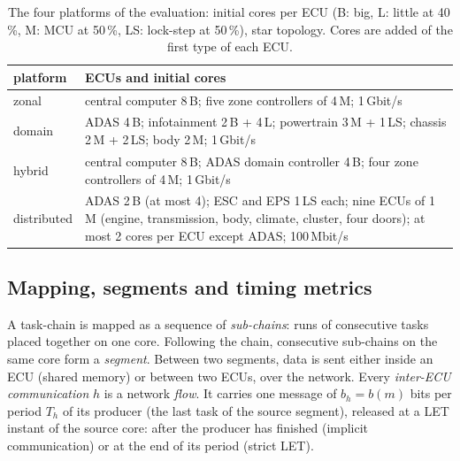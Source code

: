 \begin{table}[t]
\centering\footnotesize
\caption{The four platforms of the evaluation: initial cores per ECU
(B: big, L: little at 40\,\%, M: MCU at 50\,\%, LS: lock-step at
50\,\%), star topology. Cores are added of the first type of each ECU.}
\label{tab:templates}
\setlength{\tabcolsep}{3pt}
\begin{tabularx}{\columnwidth}{@{}lX@{}}
\toprule
\rowcolor{white}
platform & ECUs and initial cores \\
\midrule
zonal & central computer 8\,B; five zone controllers of 4\,M; 1\,Gbit/s \\
domain & ADAS 4\,B; infotainment 2\,B + 4\,L; powertrain 3\,M + 1\,LS;
chassis 2\,M + 2\,LS; body 2\,M; 1\,Gbit/s \\
hybrid & central computer 8\,B; ADAS domain controller 4\,B; four zone
controllers of 4\,M; 1\,Gbit/s \\
distributed & ADAS 2\,B (at most 4); ESC and EPS 1\,LS each; nine ECUs
of 1\,M (engine, transmission, body, climate, cluster, four doors); at
most 2 cores per ECU except ADAS; 100\,Mbit/s \\
\bottomrule
\end{tabularx}
\end{table}

\subsection{Mapping, segments and timing metrics}
\label{sec:metrics}

A task-chain is mapped as a sequence of \emph{sub-chains}: runs of
consecutive tasks placed together on one core. Following the chain,
consecutive sub-chains on the same core form a \emph{segment}. Between two
segments, data is sent either inside an ECU (shared memory) or between two
ECUs, over the network. Every \emph{inter-ECU communication} $h$ is a
network \emph{flow}. It carries one message of $b_h=b(m)$ bits per period
$T_h$ of its producer (the last task of the source segment), released at a
LET instant of the source core: after the producer has finished
(implicit communication) or at the end of its period (strict LET).

